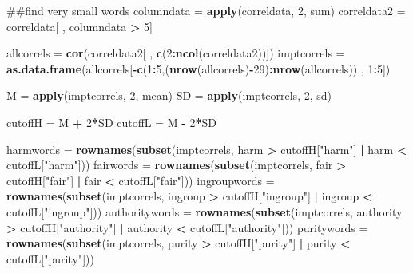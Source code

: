\documentclass[english,man]{apa6}
\newenvironment{Shaded}{\begin{snugshade}}{\end{snugshade}}
\newcommand{\KeywordTok}[1]{\textcolor[rgb]{0.13,0.29,0.53}{\textbf{#1}}}
\newcommand{\DecValTok}[1]{\textcolor[rgb]{0.00,0.00,0.81}{#1}}
\newcommand{\StringTok}[1]{\textcolor[rgb]{0.31,0.60,0.02}{#1}}
\newcommand{\OperatorTok}[1]{\textcolor[rgb]{0.81,0.36,0.00}{\textbf{#1}}}
\newcommand{\NormalTok}[1]{#1}
\newcounter{author}
\theoremstyle{definition}
\theoremstyle{definition}
\theoremstyle{definition}
\theoremstyle{remark}
\begin{document}
\begin{Shaded}
\begin{Highlighting}[]
\NormalTok{##find very small words}
\NormalTok{columndata =}\StringTok{ }\KeywordTok{apply}\NormalTok{(correldata, }\DecValTok{2}\NormalTok{, sum) }
\NormalTok{correldata2 =}\StringTok{ }\NormalTok{correldata[ , columndata }\OperatorTok{>}\StringTok{ }\DecValTok{5}\NormalTok{]}

\NormalTok{allcorrels =}\StringTok{ }\KeywordTok{cor}\NormalTok{(correldata2[ , }\KeywordTok{c}\NormalTok{(}\DecValTok{2}\OperatorTok{:}\KeywordTok{ncol}\NormalTok{(correldata2))])}
\NormalTok{imptcorrels =}\StringTok{ }\KeywordTok{as.data.frame}\NormalTok{(allcorrels[}\OperatorTok{-}\KeywordTok{c}\NormalTok{(}\DecValTok{1}\OperatorTok{:}\DecValTok{5}\NormalTok{,(}\KeywordTok{nrow}\NormalTok{(allcorrels)}\OperatorTok{-}\DecValTok{29}\NormalTok{)}\OperatorTok{:}\KeywordTok{nrow}\NormalTok{(allcorrels)) , }\DecValTok{1}\OperatorTok{:}\DecValTok{5}\NormalTok{])}

\NormalTok{M =}\StringTok{ }\KeywordTok{apply}\NormalTok{(imptcorrels, }\DecValTok{2}\NormalTok{, mean)}
\NormalTok{SD =}\StringTok{ }\KeywordTok{apply}\NormalTok{(imptcorrels, }\DecValTok{2}\NormalTok{, sd)}

\NormalTok{cutoffH =}\StringTok{ }\NormalTok{M }\OperatorTok{+}\StringTok{ }\DecValTok{2}\OperatorTok{*}\NormalTok{SD}
\NormalTok{cutoffL =}\StringTok{ }\NormalTok{M }\OperatorTok{-}\StringTok{ }\DecValTok{2}\OperatorTok{*}\NormalTok{SD}

\NormalTok{harmwords =}\StringTok{ }\KeywordTok{rownames}\NormalTok{(}\KeywordTok{subset}\NormalTok{(imptcorrels, harm }\OperatorTok{>}\StringTok{ }\NormalTok{cutoffH[}\StringTok{"harm"}\NormalTok{] }\OperatorTok{|}\StringTok{ }\NormalTok{harm }\OperatorTok{<}\StringTok{ }\NormalTok{cutoffL[}\StringTok{"harm"}\NormalTok{]))}
\NormalTok{fairwords =}\StringTok{ }\KeywordTok{rownames}\NormalTok{(}\KeywordTok{subset}\NormalTok{(imptcorrels, fair }\OperatorTok{>}\StringTok{ }\NormalTok{cutoffH[}\StringTok{"fair"}\NormalTok{] }\OperatorTok{|}\StringTok{ }\NormalTok{fair }\OperatorTok{<}\StringTok{ }\NormalTok{cutoffL[}\StringTok{"fair"}\NormalTok{]))}
\NormalTok{ingroupwords =}\StringTok{ }\KeywordTok{rownames}\NormalTok{(}\KeywordTok{subset}\NormalTok{(imptcorrels, ingroup }\OperatorTok{>}\StringTok{ }\NormalTok{cutoffH[}\StringTok{"ingroup"}\NormalTok{] }\OperatorTok{|}\StringTok{ }\NormalTok{ingroup }\OperatorTok{<}\StringTok{ }\NormalTok{cutoffL[}\StringTok{"ingroup"}\NormalTok{]))}
\NormalTok{authoritywords =}\StringTok{ }\KeywordTok{rownames}\NormalTok{(}\KeywordTok{subset}\NormalTok{(imptcorrels, authority }\OperatorTok{>}\StringTok{ }\NormalTok{cutoffH[}\StringTok{"authority"}\NormalTok{] }\OperatorTok{|}\StringTok{ }\NormalTok{authority }\OperatorTok{<}\StringTok{ }\NormalTok{cutoffL[}\StringTok{"authority"}\NormalTok{]))}
\NormalTok{puritywords =}\StringTok{ }\KeywordTok{rownames}\NormalTok{(}\KeywordTok{subset}\NormalTok{(imptcorrels, purity }\OperatorTok{>}\StringTok{ }\NormalTok{cutoffH[}\StringTok{"purity"}\NormalTok{] }\OperatorTok{|}\StringTok{ }\NormalTok{purity }\OperatorTok{<}\StringTok{ }\NormalTok{cutoffL[}\StringTok{"purity"}\NormalTok{]))}


\end{Highlighting}
\end{Shaded}
\end{document}
